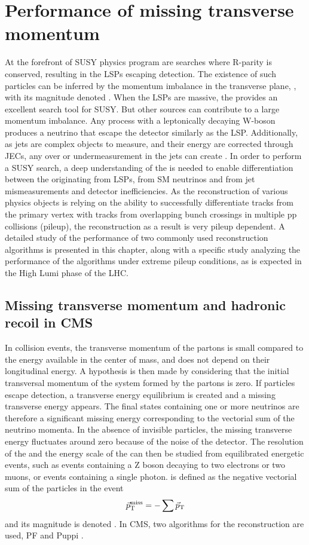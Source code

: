 \chapter{Performance of missing transverse momentum}\label{}
At the forefront of SUSY physics program are searches where R-parity is conserved, resulting in the LSPs escaping detection. The existence of such particles can be inferred by the momentum imbalance in the transverse plane, \ptvecmiss, with its magnitude denoted \ptmiss. When the LSPs are massive, the \ptmiss provides an excellent search tool for SUSY. But other sources can contribute to a large momentum imbalance. Any process with a leptonically decaying W-boson produces a neutrino that escape the detector similarly as the LSP. Additionally, as jets are complex objects to measure, and their energy are corrected through JECs, any over or undermeasurement in the jets can create \ptmiss. In order to perform a SUSY search, a deep understanding of the \ptmiss is needed to enable differentiation between the \ptmiss originating from LSPs, from SM neutrinos and from jet mismeasurements and detector inefficiencies. As the reconstruction of various physics objects is relying on the ability to successfully differentiate tracks from the primary vertex with tracks from overlapping bunch crossings in multiple pp collisions (pileup), the \ptmiss reconstruction as a result is very pileup dependent. A detailed study of the performance of two commonly used \ptmiss reconstruction algorithms is presented in this chapter, along with a specific study analyzing the performance of the algorithms under extreme pileup conditions, as is expected in the High Lumi phase of the LHC.    
\section{Missing transverse momentum and hadronic recoil in CMS}
\label{sec:introduction}
In collision events, the transverse momentum of the partons is small compared to the energy available in the center of mass, and does not depend on their longitudinal energy. A hypothesis is then made by considering that the initial transversal momentum of the system formed by the partons is zero. If particles escape detection, a transverse energy equilibrium is created and a missing transverse energy appears. The final states containing one or more neutrinos are therefore a significant missing energy corresponding to the vectorial sum of the neutrino momenta. 
In the absence of invisible particles, the missing transverse energy fluctuates around zero because of the noise of the detector. The resolution of the \ptmiss and the energy scale of the \ptmiss can then be studied from equilibrated energetic events, such as events containing a Z boson decaying to two electrons or two muons, or events containing a single photon. 
\label{sec:reconstruction}
\ptmiss is defined as the negative vectorial sum of the particles in the event
\begin{equation}
\vec{p}_{\rm{T}}^{\rm{ miss}} =- \sum \vec{p}_\mathrm{T}
\label{eq:MET}
\end{equation}                                                                      
and its magnitude is denoted \ptmiss. 
In CMS, two algorithms for the \ptmiss reconstruction are used, PF \ptmiss and Puppi \ptmiss. 
